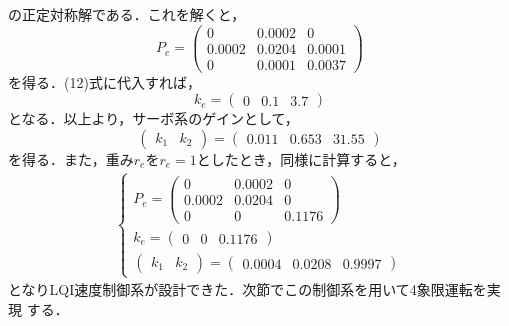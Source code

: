 \documentclass[a4paper,12pt]{jarticle}
\begin{document}
%
の正定対称解である．これを解くと，
%
\begin{equation}
 P_e =
  \begin{pmatrix}
   0      & 0.0002 & 0 \\
   0.0002 & 0.0204 & 0.0001 \\
   0      & 0.0001 & 0.0037
  \end{pmatrix}
\end{equation}
%
を得る．(12)式に代入すれば，
%
\begin{equation}
k_e =
  \begin{pmatrix}
   0 & 0.1 & 3.7
  \end{pmatrix}
\end{equation}
%
となる．以上より，サーボ系のゲインとして，
%
\begin{equation}
 \begin{pmatrix}
  k_1 & k_2
 \end{pmatrix}
 =
 \begin{pmatrix}
  0.011 & 0.653  & 31.55
 \end{pmatrix}
\end{equation}
%
を得る．また，重み$r_e$を$r_e=1$としたとき，同様に計算すると，
%
\begin{eqnarray}
 \begin{cases}
P_e=
  \begin{pmatrix}
   0      & 0.0002 & 0 \\
   0.0002 & 0.0204 & 0 \\
   0      &   0    & 0.1176 
 \end{pmatrix}
  \\
k_e=
\begin{pmatrix}
 0 & 0 & 0.1176
\end{pmatrix}
\\
\begin{pmatrix}
 k_1 & k_2
\end{pmatrix}
=
\begin{pmatrix}
 0.0004 & 0.0208 & 0.9997 
\end{pmatrix}
 
\end{cases}
\end{eqnarray}
%
となりLQI速度制御系が設計できた．次節でこの制御系を用いて4象限運転を実現
する．

\end{document}

